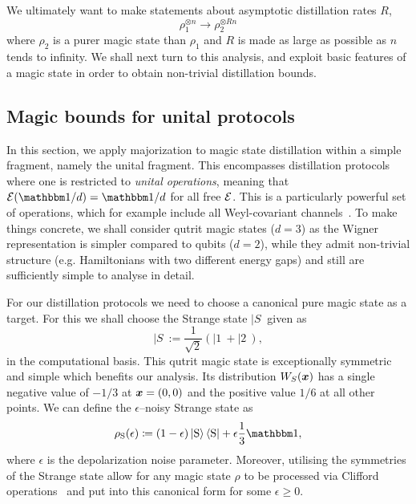 \documentclass[pra,
aps,
twocolumn,
superscriptaddress,
groupedaddress,
nofootinbib,
reprint
]{revtex4-1}
\begin{document}
We ultimately want to make statements about asymptotic distillation rates $R$,
\begin{equation}
\rho_1^{\otimes n} \longrightarrow \rho_2^{\otimes R n}
\end{equation}
where $\rho_2$ is a purer magic state than $\rho_1$ and $R$ is made as large as possible as $n$ tends to infinity. We shall next turn to this analysis, and exploit basic features of a magic state in order to obtain non-trivial distillation bounds.

\subsection{Magic bounds for unital protocols}
\label{sec:unital}

In this section, we apply majorization to magic state distillation within a simple fragment, namely the unital fragment. This encompasses distillation protocols where one is restricted to \emph{unital operations}, meaning that $\E(\I/d) = \I/d$ for all free $\mathcal{E}$. This is a particularly powerful set of operations, which for example include all Weyl-covariant channels~\cite{cit:gross3}. To make things concrete, we shall consider qutrit magic states ($d=3$) as the Wigner representation is simpler compared to qubits ($d=2$), while they admit non-trivial structure (e.g. Hamiltonians with two different energy gaps) and still are sufficiently simple to analyse in detail.

For our distillation protocols we need to choose a canonical pure magic state as a target. For this we shall choose the Strange state $|S\>$ given as
\begin{equation}
|S\> := \frac{1}{\sqrt{2}} (|1\> + |2\>),
\end{equation}
in the computational basis. This qutrit magic state is exceptionally symmetric and simple which benefits our analysis. Its distribution $W_S(\boldsymbol{x})$ has a single negative value of $-1/3$ at $\boldsymbol{x} =(0,0)$ and the positive value $1/6$ at all other points. We can define the $\epsilon$--noisy Strange state as
\begin{equation}\label{eq:noisysn}
    \rho_{\rm{S}}(\epsilon)\coloneqq (1 - \epsilon) \ket{\rm{S}}\bra{\rm{S}} + \epsilon \frac{1}{3}\id,
\end{equation}
where $\epsilon$ is the depolarization noise parameter. Moreover, utilising the symmetries of the Strange state allow for any magic state $\rho$ to be processed via Clifford operations~\cite{cit:prakash,cit:prakash2} and put into this canonical form for some $\epsilon \ge 0$.
\end{document}
